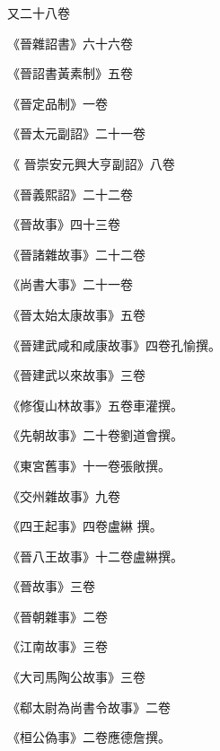 \begin{pinyinscope}
 又二十八卷



 《晉雜詔書》六十六卷



 《晉詔書黃素制》五卷



 《晉定品制》一卷



 《晉太元副詔》二十一卷



 《
 晉崇安元興大亨副詔》八卷



 《晉義熙詔》二十二卷



 《晉故事》四十三卷



 《晉諸雜故事》二十二卷



 《尚書大事》二十一卷



 《晉太始太康故事》五卷



 《晉建武咸和咸康故事》四卷孔愉撰。



 《晉建武以來故事》三卷



 《修復山林故事》五卷車灌撰。



 《先朝故事》二十卷劉道會撰。



 《東宮舊事》十一卷張敞撰。



 《交州雜故事》九卷



 《四王起事》四卷盧綝
 撰。



 《晉八王故事》十二卷盧綝撰。



 《晉故事》三卷



 《晉朝雜事》二卷



 《江南故事》三卷



 《大司馬陶公故事》三卷



 《郗太尉為尚書令故事》二卷



 《桓公偽事》二卷應德詹撰。




\end{pinyinscope}
